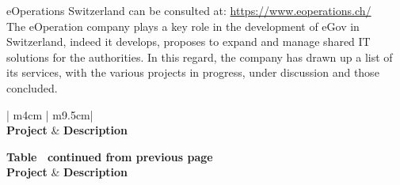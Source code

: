 eOperations Switzerland can be consulted at: \url{https://www.eoperations.ch/}\\

The eOperation company plays a key role in the development of eGov in Switzerland,
indeed it develops, proposes to expand and manage shared IT solutions for the authorities.
In this regard, the company has drawn up a list of its services, with the various projects in progress, under discussion and those concluded.\\

\begin{longtable}[ c ]{| m{4cm} | m{9.5cm}|}
\hline
{}                                                                                                                                                      \\ \hline
\textbf{Project} & \textbf{Description                                                                                                } \\ \hline
\endfirsthead

{{\bfseries Table \thetable\ continued from previous page}} \\
\hline
\textbf{Project} & \textbf{Description} \\ \hline
\endhead


\end{longtable}
